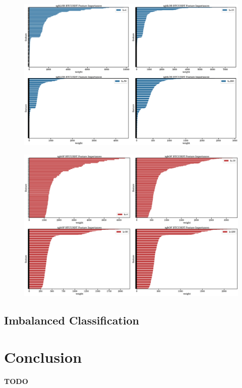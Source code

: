 \documentclass[a4paper, oneside, notitlepage]{book}
\begin{document}
\begin{figure}[htpb]
    \centering
    \includegraphics[width=1.0\textwidth]{./images/xgboost_LOB_BTCUSDT_all_feature_importances.png}
    \caption{}
\end{figure}

\begin{figure}[htpb]
    \centering
    \includegraphics[width=1.0\textwidth]{./images/xgboost_OF_BTCUSDT_all_feature_importances.png}
    \caption{}
\end{figure}

\subsection{Imbalanced Classification}



\section{Conclusion}
\textbf{TODO}
\end{document}
